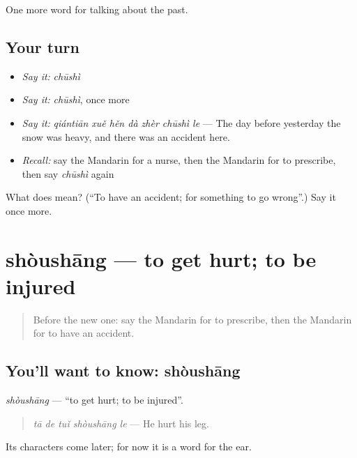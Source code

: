 \begin{grammarlens}[title={What you've built}]
One more word for talking about the past.
\end{grammarlens}

\subsection*{Your turn}
\begin{itemize}
\raggedright
  \item \emph{Say it:} \emph{chūshì}
  \item \emph{Say it:} \emph{chūshì}, once more
  \item \emph{Say it:} \emph{qiántiān xuě hěn dà zhèr chūshì le} — The day before yesterday the snow was heavy, and there was an accident here.
  \item \emph{Recall:} say the Mandarin for a nurse, then the Mandarin for to prescribe, then say \emph{chūshì} again
\end{itemize}

\begin{tcolorbox}[breakable,colback=teal!4,colframe=teal!35!black,title={Before you move on}]
What does  mean? (\textquotedblleft{}To have an accident; for something to go wrong\textquotedblright{}.) Say it once more.
\end{tcolorbox}
\section[shòushāng]{shòushāng — to get hurt; to be injured}

\label{lesson:ZH-C232-shoushang}



\begin{quote}
Before the new one: say the Mandarin for to prescribe, then the Mandarin for to have an accident.
\end{quote}

\subsection*{You'll want to know: shòushāng}
\emph{shòushāng} — \textquotedblleft{}to get hurt; to be injured\textquotedblright{}.

\begin{quote}
\emph{tā de tuǐ shòushāng le} — He hurt his leg.
\end{quote}

Its characters come later; for now it is a word for the ear.

